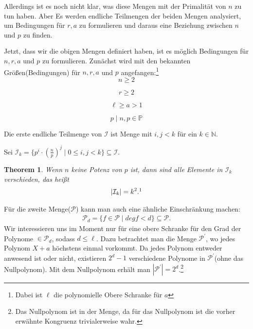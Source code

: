 \documentclass[12pt,oneside]{article}
\newtheorem{theorem}{Theorem}[section]
\theoremstyle{remark}
\theoremstyle{definition}
\begin{document}
\begin{flushleft}
Allerdings ist es noch nicht klar, was diese Mengen mit der Primalität von $n$ zu tun haben. Aber Es werden endliche Teilmengen der beiden Mengen analysiert, um Bedingungen für $r,a$ zu formulieren und daraus eine Beziehung zwischen $n$ und $p$ zu finden.

Jetzt, dass wir die obigen Mengen definiert haben, ist es möglich Bedingungen für $n,r,a$ und $p$ zu formulieren. Zunächst wird mit den bekannten Größen(Bedingungen) für $n,r,a$ und $p$ angefangen:\footnote{Dabei ist $\ell$ die polynomielle Obere Schranke für $a$}
\begin{equation}
    n \geq 2 
\end{equation}

\begin{equation}
    r \geq 2
\end{equation}

\begin{equation}
\ell \geq  a > 1
\end{equation}

\begin{equation}
p \mid n, p \in \mathbb{P}    
\end{equation}

Die erste endliche Teilmenge von $\mathcal{I}$ ist Menge mit $i,j < k$ für ein $k \in \mathbb{N}$.

Sei $\mathcal{I}_k= \{ p^{i} \cdot (\frac{n}{p})^j \mid 0 \leq i,j < k\} \subseteq \mathcal{I}$.\newline


\begin{theorem}\label{order-I-k}
Wenn $n$ keine Potenz von $p$ ist, dann sind alle Elemente in $\mathcal{I}_k$ verschieden, das heißt
\begin{align*}
    |\mathcal{I}_k| = k^2.\footnotemark 
\end{align*}
\end{theorem}

Für die zweite Menge($\mathcal{P}$) kann man auch eine ähnliche Einschränkung machen:
\begin{align*}
    \mathcal{P}_d = \{ f \in \mathcal{P} \mid deg f < d \} \subseteq \mathcal{P}.
\end{align*}
Wir interessieren uns im Moment nur für eine obere Schranke für den Grad der Polynome $\in \mathcal{P}_d$, sodass $d \leq \ell$. Dazu betrachtet man die Menge $\mathcal{P}^{'}$, wo jedes Polynom $X + a$ höchstens einmal vorkommt. Da jedes Polynom entweder anwesend ist oder nicht, existieren $2^d - 1$ verschiedene Polynome in $\mathcal{P}^{'}$(ohne das Nullpolynom). Mit dem Nullpolynom erhält man $|\mathcal{P}^{'}|= 2^d $.\footnote{Das Nullpolynom ist in der Menge, da für das Nullpolynom ist die vorher erwähnte Kongruenz trivialerweise wahr.}


\end{flushleft}
\end{document}

